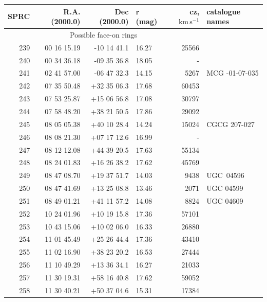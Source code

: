 \documentclass[useAMS,usenatbib]{mn2e}
\newcommand{\km}{\,\mbox{km}\,\mbox{s}^{-1}}
\begin{document}
  \begin{table}
 \contcaption{ }
 \begin{tabular}{rrrlrl}
 \hline
SPRC  &  R.A. (2000.0)   &  Dec (2000.0)  &  r (mag)     & cz, $\km$& catalogue names  \\
 \hline
 \multicolumn{5}{c}{Possible face-on rings }\\
 239 &  00 16 15.19 & -10 14 41.1 &  16.27 &  25566 &                  \\
 240 &  00 34 36.18 & -09 35 36.8 &  18.05 &      - &                  \\
 241 &  02 41 57.00 & -06 47 32.3 &  14.15 &   5267 &   MCG -01-07-035 \\
 242 &  07 35 50.48 & +32 35 06.3 &  17.68 &  60453 &                  \\
 243 &  07 53 25.87 & +15 06 56.8 &  17.08 &  30797 &                  \\
 244 &  07 58 48.20 & +38 21 50.5 &  17.86 &  29092 &                  \\
 245 &  08 05 05.38 & +40 10 28.4 &  14.24 &  15024 &     CGCG 207-027 \\
 246 &  08 08 21.30 & +07 17 12.6 &  16.99 &      - &                  \\
 247 &  08 12 12.08 & +44 39 20.5 &  17.63 &  55134 &                  \\
 248 &  08 24 01.83 & +16 26 38.2 &  17.62 &  45769 &                  \\
 249 &  08 47 08.70 & +19 37 51.7 &  14.03 &   9438 &       UGC~04596  \\
 250 &  08 47 41.69 & +13 25 08.8 &  13.46 &   2071 &     UGC 04599    \\
 251 &  08 49 01.21 & +41 11 57.2 &  14.08 &   8824 &     UGC 04609    \\
 252 &  10 24 01.96 & +10 19 15.8 &  17.36 &  57101 &                  \\
 253 &  10 43 15.06 & +10 02 06.0 &  16.33 &  26880 &                  \\
 254 &  11 01 45.49 & +25 26 44.4 &  17.36 &  43410 &                  \\
 255 &  11 02 16.90 & +38 23 20.2 &  16.53 &  27444 &                  \\
 256 &  11 10 49.29 & +13 36 34.1 &  16.27 &  21033 &                  \\
 257 &  11 30 19.31 & +58 16 40.8 &  17.62 &  59052 &                  \\
 258 &  11 30 40.21 & +50 37 04.6 &  15.31 &  17384 &                  \\

\end{tabular}
\end{table}
\end{document}
